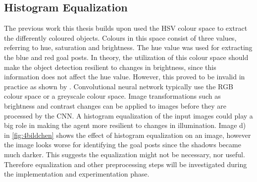\subsection{Histogram Equalization}

The previous work this thesis builds upon used the HSV colour space to extract the differently coloured objects. Colours in this space consist of three values, referring to hue, saturation and brightness. The hue value was used for extracting the blue and red goal posts. In theory, the utilization of this colour space should make the object detection resilient to changes in brightness, since this information does not affect the hue value. However, this proved to be invalid in practice as shown by \autocite{maximilian}.
Convolutional neural network typically use the RGB colour space or a greyscale colour space. Image transformations such as brightness and contrast changes can be applied to images before they are processed by the CNN. A histogram equalization of the input images could play a big role in making the agent more resilient to changes in illumination. Image d) in \ref{fig:4bildchen} shows the effect of histogram equalization on an image, however the image looks worse for identifying the goal posts since the shadows became much darker. This suggests the equalization might not be necessary, nor useful. Therefore equalization and other preprocessing steps will be investigated during the implementation and experimentation phase.




